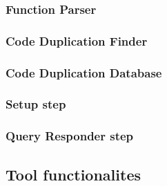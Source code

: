 \subsubsection{Function Parser}

\subsubsection{Code Duplication Finder}

\subsubsection{Code Duplication Database}

\subsubsection{Setup step}

\subsubsection{Query Responder step}


\subsection{Tool functionalites}
\label{subsec:func}
